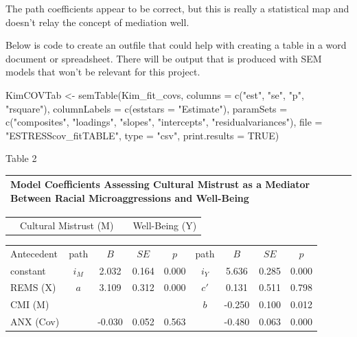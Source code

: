 \documentclass[
  english,
]{book}
\newenvironment{Shaded}{\begin{snugshade}}{\end{snugshade}}
\newcommand{\AttributeTok}[1]{\textcolor[rgb]{0.77,0.63,0.00}{#1}}
\newcommand{\ConstantTok}[1]{\textcolor[rgb]{0.00,0.00,0.00}{#1}}
\newcommand{\FunctionTok}[1]{\textcolor[rgb]{0.00,0.00,0.00}{#1}}
\newcommand{\NormalTok}[1]{#1}
\newcommand{\OtherTok}[1]{\textcolor[rgb]{0.56,0.35,0.01}{#1}}
\newcommand{\StringTok}[1]{\textcolor[rgb]{0.31,0.60,0.02}{#1}}
\begin{document}
The path coefficients appear to be correct, but this is really a statistical map and doesn't relay the concept of mediation well.

Below is code to create an outfile that could help with creating a table in a word document or spreadsheet. There will be output that is produced with SEM models that won't be relevant for this project.

\begin{Shaded}
\begin{Highlighting}[]
\NormalTok{KimCOVTab }\OtherTok{\textless{}{-}} \FunctionTok{semTable}\NormalTok{(Kim\_fit\_covs, }\AttributeTok{columns =} \FunctionTok{c}\NormalTok{(}\StringTok{"est"}\NormalTok{, }\StringTok{"se"}\NormalTok{, }\StringTok{"p"}\NormalTok{, }\StringTok{"rsquare"}\NormalTok{),  }\AttributeTok{columnLabels =} \FunctionTok{c}\NormalTok{(}\AttributeTok{eststars =} \StringTok{"Estimate"}\NormalTok{), }\AttributeTok{paramSets =} \FunctionTok{c}\NormalTok{(}\StringTok{"composites"}\NormalTok{, }\StringTok{"loadings"}\NormalTok{, }\StringTok{"slopes"}\NormalTok{, }\StringTok{"intercepts"}\NormalTok{, }\StringTok{"residualvariances"}\NormalTok{), }\AttributeTok{file =} \StringTok{"ESTRESScov\_fitTABLE"}\NormalTok{, }\AttributeTok{type =} \StringTok{"csv"}\NormalTok{, }\AttributeTok{print.results =} \ConstantTok{TRUE}\NormalTok{)}
\end{Highlighting}
\end{Shaded}

Table 2

\begin{longtable}[]{@{}
  >{\raggedright\arraybackslash}p{}@{}}
\toprule
Model Coefficients Assessing Cultural Mistrust as a Mediator Between Racial Microaggressions and Well-Being \\
\midrule
\endhead
\bottomrule
\end{longtable}

\begin{longtable}[]{@{}lccc@{}}
\toprule
& & & \\
\midrule
\endhead
& Cultural Mistrust (M) & & Well-Being (Y) \\
\bottomrule
\end{longtable}

\begin{longtable}[]{@{}lcccccccc@{}}
\toprule
& & & & & & & & \\
\midrule
\endhead
Antecedent & path & \(B\) & \(SE\) & \(p\) & path & \(B\) & \(SE\) & \(p\) \\
constant & \(i_{M}\) & 2.032 & 0.164 & 0.000 & \(i_{Y}\) & 5.636 & 0.285 & 0.000 \\
REMS (X) & \(a\) & 3.109 & 0.312 & 0.000 & \(c'\) & 0.131 & 0.511 & 0.798 \\
CMI (M) & & & & & \(b\) & -0.250 & 0.100 & 0.012 \\
ANX (Cov) & & -0.030 & 0.052 & 0.563 & & -0.480 & 0.063 & 0.000 \\
\bottomrule
\end{longtable}
\end{document}
